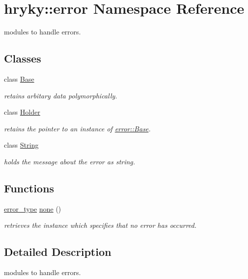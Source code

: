\hypertarget{namespacehryky_1_1error}{\section{hryky\-:\-:error Namespace Reference}
\label{namespacehryky_1_1error}
}


modules to handle errors.  


\subsection*{Classes}
\begin{DoxyCompactItemize}
\item 
class \hyperlink{classhryky_1_1error_1_1_base}{Base}
\begin{DoxyCompactList}\small\item\em retains arbitary data polymorphically. \end{DoxyCompactList}\item 
class \hyperlink{classhryky_1_1error_1_1_holder}{Holder}
\begin{DoxyCompactList}\small\item\em retains the pointer to an instance of \hyperlink{classhryky_1_1error_1_1_base}{error\-::\-Base}. \end{DoxyCompactList}\item 
class \hyperlink{classhryky_1_1error_1_1_string}{String}
\begin{DoxyCompactList}\small\item\em holds the message about the error as string. \end{DoxyCompactList}\end{DoxyCompactItemize}
\subsection*{Functions}
\begin{DoxyCompactItemize}
\item 
\hypertarget{namespacehryky_1_1error_a2297263ac1d9f9ba605bf565b6333a57}{\hyperlink{classhryky_1_1error_1_1_holder}{error\-\_\-type} \hyperlink{namespacehryky_1_1error_a2297263ac1d9f9ba605bf565b6333a57}{none} ()}\label{namespacehryky_1_1error_a2297263ac1d9f9ba605bf565b6333a57}

\begin{DoxyCompactList}\small\item\em retrieves the instance which specifies that no error has occurred. \end{DoxyCompactList}\end{DoxyCompactItemize}


\subsection{Detailed Description}
modules to handle errors. 